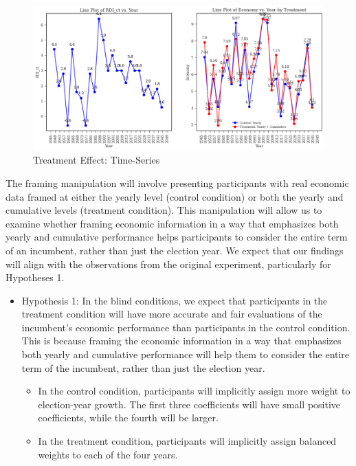 \documentclass[
]{article}
\providecommand{\tightlist}{%
  \setlength{\itemsep}{0pt}\setlength{\parskip}{0pt}}
\begin{document}
\begin{figure}
\hypertarget{fig:label}{%
\centering
\includegraphics[width=1\textwidth,height=1\textheight]{difcum2.png}
\caption{Treatment Effect: Time-Series}\label{fig:label}
}
\end{figure}

The framing manipulation will involve presenting participants with real
economic data framed at either the yearly level (control condition) or
both the yearly and cumulative levels (treatment condition). This
manipulation will allow us to examine whether framing economic
information in a way that emphasizes both yearly and cumulative
performance helps participants to consider the entire term of an
incumbent, rather than just the election year. We expect that our
findings will align with the observations from the original experiment,
particularly for Hypotheses 1.

\begin{itemize}
\tightlist
\item
  Hypothesis 1: In the blind conditions, we expect that participants in
  the treatment condition will have more accurate and fair evaluations
  of the incumbent's economic performance than participants in the
  control condition. This is because framing the economic information in
  a way that emphasizes both yearly and cumulative performance will help
  them to consider the entire term of the incumbent, rather than just
  the election year.

  \begin{itemize}
  \tightlist
  \item
    In the control condition, participants will implicitly assign more
    weight to election-year growth. The first three coefficients will
    have small positive coefficients, while the fourth will be larger.
  \item
    In the treatment condition, participants will implicitly assign
    balanced weights to each of the four years.
  \end{itemize}
\end{itemize}
\end{document}
